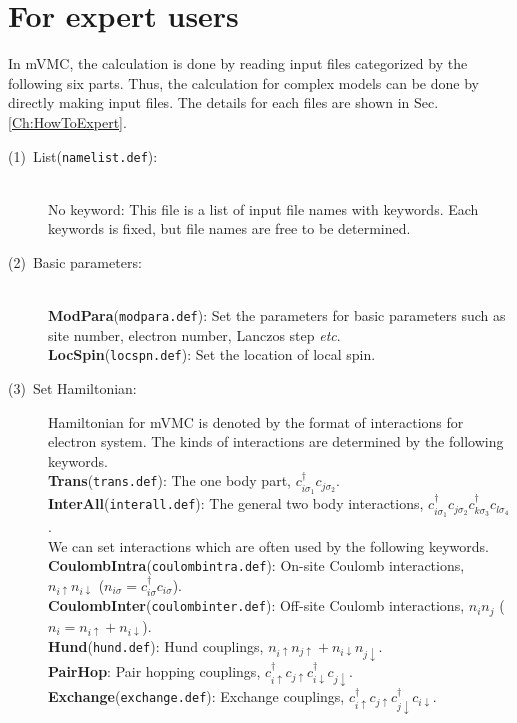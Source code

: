 \section{For expert users}
In mVMC, the calculation is done by reading input files categorized by the following six parts. 
Thus, the calculation for complex models can be done by directly making input files. The details for each files are shown in Sec. \ref{Ch:HowToExpert}.
\\
\begin{description}
\item[(1)~List(\texttt{namelist.def}):]
~\\{No keyword}:
This file is a list of input file names with keywords. Each keywords is fixed, but file names are free to be determined.  
\item[(2)~Basic parameters:]
~\\{\bf ModPara}(\verb|modpara.def|): Set the parameters for basic parameters such as site number, electron number, Lanczos step {\it etc}.
~\\{\bf LocSpin}(\verb|locspn.def|): Set the location of local spin. 
\item[(3)~Set Hamiltonian:] 
Hamiltonian for mVMC is denoted by the format of interactions for electron system. 
The kinds of interactions are determined by the following keywords. 
~\\{\bf Trans}(\verb|trans.def|): The one body part, $c_{i\sigma_1}^{\dag}c_{j\sigma_2}$.
~\\{\bf InterAll}(\verb|interall.def|): The general two body interactions, $c_ {i \sigma_1}^{\dag}c_{j\sigma_2}c_{k \sigma_3}^{\dag}c_{l \sigma_4}$.
~\\We can set interactions which are often used by the following keywords. 
~\\{\bf CoulombIntra}(\verb|coulombintra.def|): On-site Coulomb interactions, $n_ {i \uparrow}n_{i \downarrow}$ ($n_{i \sigma}=c_{i\sigma}^{\dag}c_{i\sigma}$).
~\\{\bf CoulombInter}(\verb|coulombinter.def|): Off-site Coulomb interactions, $n_ {i}n_{j}$ ($n_i=n_{i\uparrow}+n_{i\downarrow}$).
~\\{\bf Hund}(\verb|hund.def|): Hund couplings, $n_{i\uparrow}n_{j\uparrow}+n_{i\downarrow}n_{j\downarrow}$.
~\\{\bf PairHop}: Pair hopping couplings, $c_ {i \uparrow}^{\dag}c_{j\uparrow}c_{i \downarrow}^{\dag}c_{j  \downarrow}$.
~\\{\bf Exchange}(\verb|exchange.def|): Exchange couplings, $c_ {i \uparrow}^{\dag}c_{j\uparrow}c_{j \downarrow}^{\dag}c_{i  \downarrow}$.

\end{description}
